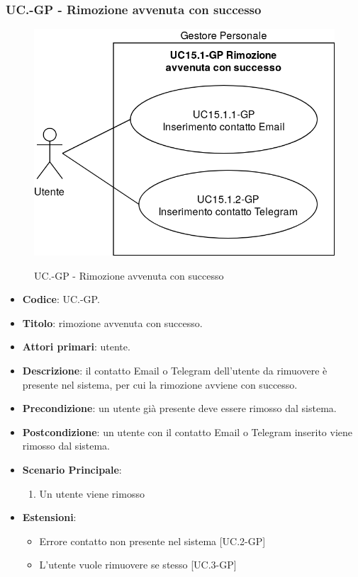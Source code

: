 	\subsubsection{UC\theuccount.\thesubuccount-GP - Rimozione avvenuta con successo}
		\begin{figure}[H]
			\centering
			\includegraphics[width=0.6\columnwidth]{img/casi_d'uso/UC15_1.png}\\
			\caption{UC\theuccount.\thesubuccount-GP - Rimozione avvenuta con successo}
		\end{figure}
		\begin{itemize}
			\item \textbf{Codice}: UC\theuccount.\thesubuccount-GP.
			\item \textbf{Titolo}: rimozione avvenuta con successo.
			\item \textbf{Attori primari}: utente.
			\item \textbf{Descrizione}: il contatto Email o Telegram dell'utente da rimuovere è presente nel sistema, per cui la rimozione avviene con successo.
			\item \textbf{Precondizione}: un utente già presente deve essere rimosso dal sistema.
			\item \textbf{Postcondizione}: un utente con il contatto Email o Telegram inserito viene rimosso dal sistema.
			\item \textbf{Scenario Principale}:
			\begin{enumerate}
				\item Un utente viene rimosso
			\end{enumerate}
			\item \textbf{Estensioni}:
			\begin{itemize}
				\item Errore contatto non presente nel sistema [UC\theuccount.2-GP]
				\item L'utente vuole rimuovere se stesso [UC\theuccount.3-GP]
			\end{itemize}
		\end{itemize}
			
